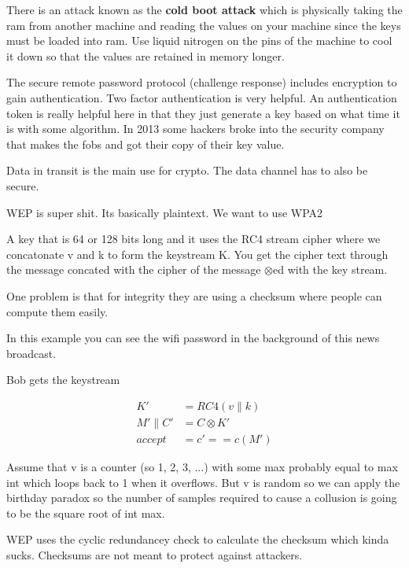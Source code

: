 \documentclass{article}
\begin{document}
There is an attack known as the \textbf{cold boot attack} which is physically taking the ram from another machine and reading the values on your machine since the keys must be loaded into ram. Use liquid nitrogen on the pins of the machine to cool it down so that the values are retained in memory longer. 


The secure remote password protocol (challenge response) includes encryption to gain authentication. Two factor authentication is very helpful. An authentication token is really helpful here in that they just generate a key based on what time it is with some algorithm. In 2013 some hackers broke into the security company that makes the fobs and got their copy of their key value. 


Data in transit is the main use for crypto. The data channel has to also be secure. 



WEP is super shit. Its basically plaintext. We want to use WPA2


A key that is 64 or 128 bits long and it uses the RC4 stream cipher where we concatonate v and k to form the keystream K. You get the cipher text through the message concated with the cipher of the message $\otimes$ed with the key stream.

One problem is that for integrity they are using a checksum where people can compute them easily.


In this example you can see the wifi password in the background of this news broadcast.


Bob gets the keystream

\begin{align*}
	K' &= RC4(v \parallel  k)\\
	M'\parallel C' &= C \otimes K'\\
	accept &= c' == c(M')
\end{align*}

Assume that v is a counter (so 1, 2, 3, ...) with some max probably equal to max int which loops back to 1 when it overflows. But v is random so we can apply the birthday paradox so the number of samples required to cause a collusion is going to be the square root of int max.


WEP uses the cyclic redundancey check to calculate the checksum which kinda sucks. Checksums are not meant to protect against attackers.
\end{document}
